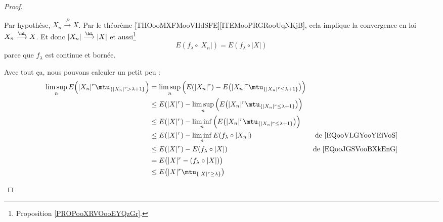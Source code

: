 \begin{proof}
\begin{subproof}
\begin{subproof}
			Par hypothèse, \( X_n\stackrel{ P}{\longrightarrow} X\). Par le théorème \ref{THOooMXFMooVHdSFE}\ref{ITEMooPRGRooUqNKjB}, cela implique la convergence en loi \( X_n\stackrel{ \hL}{\longrightarrow} X\). Et donc \( | X_n |\stackrel{ \hL}{\longrightarrow} |X|\) et aussi\footnote{Proposition \ref{PROPooXRVOooEYQzGr}.}
			\begin{equation}		\label{EQooJGSVooBXkEnG}
				E(f_{\lambda}\circ |X_n|)=E(f_{\lambda}\circ |X|)
			\end{equation}
			parce que \( f_{\lambda}\) est continue et bornée.
		\end{subproof}
		Avec tout ça, nous pouvons calculer un petit peu :
		\begin{subequations}
			\begin{align}
				\limsup_n E\Big( | X_n |^r\mtu_{\{ | X_n |^r>\lambda+1 \}} \Big) & =\limsup_n\Big( E(| X_n |^r)-E\big( | X_n |^r\mtu_{\{ | X_n |^r\leq \lambda+1 \}} \big) \Big)                                           \\
				                                                                 & \leq  E(| X |^r)  - \limsup_n\Big(E\big( | X_n |^r\mtu_{\{ | X_n |^r\leq \lambda+1 \}} \big) \Big)                                      \\
				                                                                 & \leq  E(| X |^r)  - \liminf_n\Big(E\big( | X_n |^r\mtu_{\{ | X_n |^r\leq \lambda+1 \}} \big) \Big)                                      \\
				                                                                 & \leq  E(| X |^r)  - \liminf_n E(f_{\lambda}\circ |X_n|)                                            & \text{de \eqref{EQooVLGYooYEiVoS}} \\
				                                                                 & \leq E(| X |^r)-E(f_{\lambda}\circ |X|)                                                            & \text{de \eqref{EQooJGSVooBXkEnG}} \\
				                                                                 & = E\big( | X |^r-(f_{\lambda}\circ| X |) \big)                                                                                          \\
				                                                                 & \leq E\big( | X |^r\mtu_{\{ | X |^r\geq \lambda \}} \big)
			\end{align}
		\end{subequations}

\end{subproof}
\end{proof}
